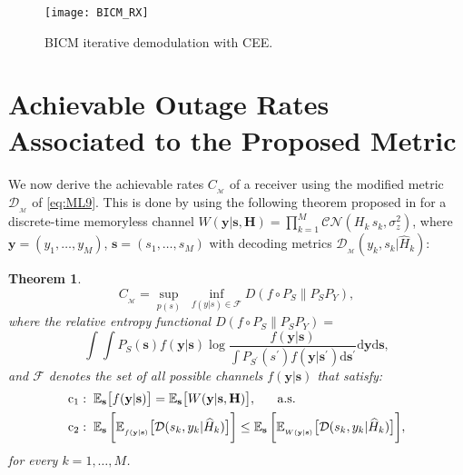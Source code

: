 \documentclass{article}
\def\Esp{\mathbb{E}}
\begin{document}
\begin{figure}[!htb]
\centering
\texttt{[image: BICM\_RX]}
\caption{BICM iterative demodulation with CEE.}\label{fig2}
\end{figure}       
\section{Achievable Outage Rates Associated to the Proposed Metric}
\label{sec:outageCap}
We now derive the achievable rates $C_{_\mathcal{M}}$ of a receiver using the modified metric $\mathcal{D}_{_\mathcal{M}}$ of \eqref{eq:ML9}. This is done by using the following theorem proposed in \cite{merhav94} for a discrete-time memoryless channel $W(\mathbf{y}|\mathbf{s},\mathbf{H})=\prod_{k=1}^M \mathcal{CN}(H_k \, s_k,\sigma^2_z)$, where $\mathbf{y}=(y_1,\dots,y_M)$,  $\mathbf{s}=(s_1,\dots,s_M)$ with decoding metrics $\mathcal{D}_{_\mathcal{M}}(y_k,s_k | \widehat{H}_k)$: 
\newtheorem{theo}{Theorem}
\begin{theo}
\label{th1}
\begin{equation}
\label{eq:outage}
C_{_\mathcal{M}}=\sup_{p(s)} \; \inf_{f(y|s)\in\mathcal{F}} D(f \!\circ\! P_S \|  P_S  P_Y),
\end{equation}   
where the relative entropy functional $D(f \!\circ\! P_S \|  P_S  P_Y)=$
\begin {equation}
\label{eq:I} 
\int \int P_S(\mathbf{s}) f(\mathbf{y}|\mathbf{s}) \log \frac{f(\mathbf{y}|\mathbf{s})} {\int P_{S^\prime}(s^\prime)f(\mathbf{y}|\mathbf{s}^\prime) \textrm{d}\mathbf{s}^\prime}  \textrm{d}\mathbf{y} \textrm{d}\mathbf{s},
\end{equation} 
and $\mathcal{F}$ denotes the set of all possible channels $f(\mathbf{y}|\mathbf{s})$ that satisfy: 
\begin{align}
&\mathrm{c_1}: \; \Esp_\mathbf{s} \big[f(\mathbf{y}|\mathbf{s})\big]=\Esp_\mathbf{s} \big[W(\mathbf{y}|\mathbf{s},\mathbf{H})\big], \;\;\;\;\;\; \textrm{a.s.}\vspace{-2mm} 
\\  \label{eq:ineqconstr}
&\mathrm{c_2}: \; \Esp_\mathbf{s}  \, \bigg[ \Esp_{_{f(\mathbf{y} |\mathbf{s} )}} \big[\mathcal{D}(s_k,y_k|\widehat{H}_k)\big] \bigg ] \leq \Esp_\mathbf{s} \, \bigg[ \Esp_{_{W(\mathbf{y} |\mathbf{s} )}} \big[\mathcal{D}(s_k,y_k|\widehat{H}_k )\big]\bigg],\vspace{-2mm}
\end{align}
for every $k=1,\dots,M$.
\end{theo}
\end{document}
